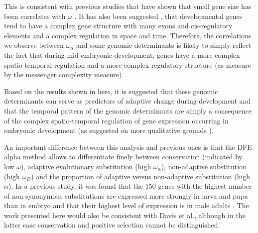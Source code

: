This is consistent with previous studies that have shown that small gene size has been correlates with $\omega$ \citep{Duret1999,Comeron2012}.
It has also been suggested \citep{Gellon1998}, that developmental genes tend to have a complex gene structure with many exons and cis-regulatory elements and a complex regulation in space and time. Therefore, the correlations we observe between $\omega_{\alpha}$ and some genomic determinants is likely to simply reflect the fact that during mid-embryonic development, genes have a more complex spatio-temporal regulation and a more complex regulatory structure (as measure by the messenger complexity measure).

Based on the results shown in here, it is suggested that these genomic determinants can serve as predictors of adaptive change during development and that the temporal pattern of the genomic determinants are simply a consequence of the complex spatio-temporal regulation of gene expression occurring in embryonic 
development (as suggested on more qualitative grounds \citealp{Duboule1998}).

An important difference between this analysis and previous ones is that the DFE-alpha method allows to differentiate finely between conservation (indicated by low $\omega$), adaptive evolutionary substitution (high $\omega_{\alpha}$), non-adaptive substitution (high $\omega_{D}$) and the proportion of adaptive versus non-adaptive substitution (high $\alpha$). 
In a previous study, it was found that the 150 genes with the highest number of non-synonymous substitutions are expressed more strongly in larva and pupa than in embryo and that their highest level of expression is in male adults \citep{Davis2005}.
The work presented here would also be consistent with Davis et al., although in the latter case conservation and positive selection cannot be distinguished.


